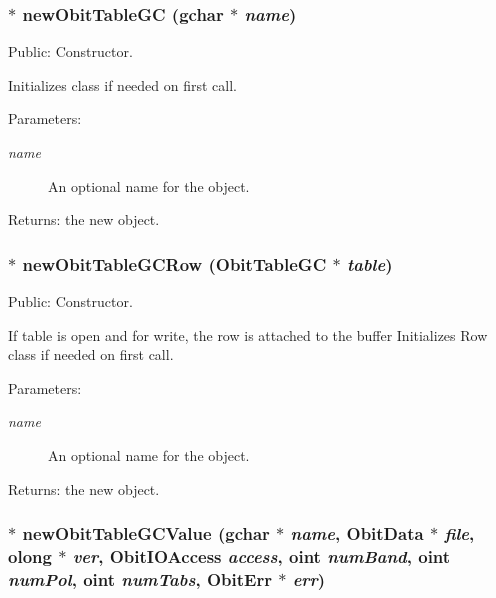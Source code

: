 \subsubsection{$\ast$ new\-Obit\-Table\-GC (gchar $\ast$ {\em name})}\label{ObitTableGC_8c_a16}


Public: Constructor. 

Initializes class if needed on first call. \begin{Desc}
\item[Parameters:]
\begin{description}
\item[{\em name}]An optional name for the object. \end{description}
\end{Desc}
\begin{Desc}
\item[Returns:]the new object. \end{Desc}
\subsubsection{$\ast$ new\-Obit\-Table\-GCRow ({\bf Obit\-Table\-GC} $\ast$ {\em table})}\label{ObitTableGC_8c_a14}


Public: Constructor. 

If table is open and for write, the row is attached to the buffer Initializes Row class if needed on first call. \begin{Desc}
\item[Parameters:]
\begin{description}
\item[{\em name}]An optional name for the object. \end{description}
\end{Desc}
\begin{Desc}
\item[Returns:]the new object. \end{Desc}
\subsubsection{$\ast$ new\-Obit\-Table\-GCValue (gchar $\ast$ {\em name}, {\bf Obit\-Data} $\ast$ {\em file}, {\bf olong} $\ast$ {\em ver}, Obit\-IOAccess {\em access}, {\bf oint} {\em num\-Band}, {\bf oint} {\em num\-Pol}, {\bf oint} {\em num\-Tabs}, {\bf Obit\-Err} $\ast$ {\em err})}\label{ObitTableGC_8c_a18}


